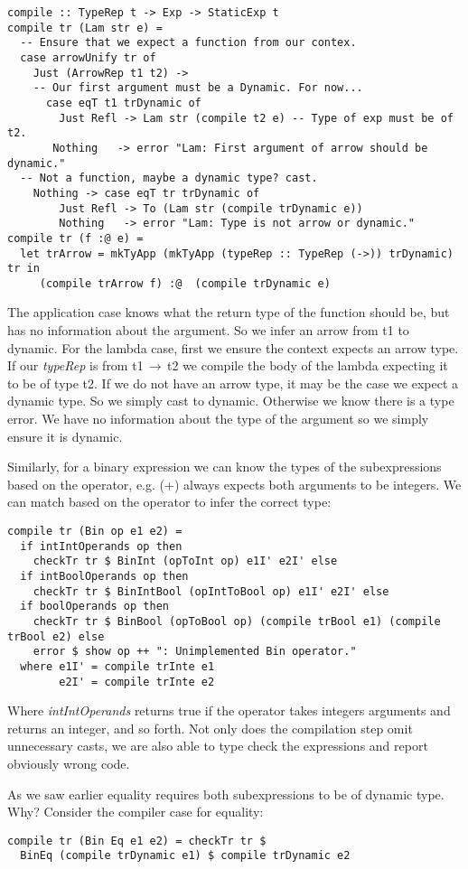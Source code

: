 \documentclass{article}
\begin{document}
\begin{verbatim}
compile :: TypeRep t -> Exp -> StaticExp t
compile tr (Lam str e) =
  -- Ensure that we expect a function from our contex.
  case arrowUnify tr of
    Just (ArrowRep t1 t2) ->
    -- Our first argument must be a Dynamic. For now...
      case eqT t1 trDynamic of
        Just Refl -> Lam str (compile t2 e) -- Type of exp must be of t2.
       Nothing   -> error "Lam: First argument of arrow should be dynamic."
  -- Not a function, maybe a dynamic type? cast.
    Nothing -> case eqT tr trDynamic of
        Just Refl -> To (Lam str (compile trDynamic e))
        Nothing   -> error "Lam: Type is not arrow or dynamic."
compile tr (f :@ e) =
  let trArrow = mkTyApp (mkTyApp (typeRep :: TypeRep (->)) trDynamic) tr in
     (compile trArrow f) :@  (compile trDynamic e)
\end{verbatim}
The application case knows what the return type of the function should be, but has no information about the argument. So we infer an arrow from t1 to dynamic. For the lambda case, first we ensure the context expects an arrow type. If our \textit{typeRep} is from t1$\,\to\,$t2 we compile the body of the lambda expecting it to be of type t2. If we do not have an arrow type, it may be the case we expect a dynamic type. So we simply cast to dynamic. Otherwise we know there is a type error. We have no information about the type of the argument so we simply ensure it is dynamic.

Similarly, for a binary expression we can know the types of the subexpressions based on the operator, e.g. (+) always expects both arguments to be integers. We can match based on the operator to infer the correct type:
\begin{verbatim}
compile tr (Bin op e1 e2) =
  if intIntOperands op then
    checkTr tr $ BinInt (opToInt op) e1I' e2I' else
  if intBoolOperands op then
    checkTr tr $ BinIntBool (opIntToBool op) e1I' e2I' else
  if boolOperands op then
    checkTr tr $ BinBool (opToBool op) (compile trBool e1) (compile trBool e2) else
    error $ show op ++ ": Unimplemented Bin operator."
  where e1I' = compile trInte e1
        e2I' = compile trInte e2
\end{verbatim}
Where \textit{intIntOperands} returns true if the operator takes integers arguments and returns an integer, and so forth. Not only does the compilation step omit unnecessary casts, we are also able to type check the expressions and report obviously wrong code.

As we saw earlier equality requires both subexpressions to be of dynamic type. Why? Consider the compiler case for equality:
\begin{verbatim}
compile tr (Bin Eq e1 e2) = checkTr tr $
  BinEq (compile trDynamic e1) $ compile trDynamic e2
\end{verbatim}
\end{document}
